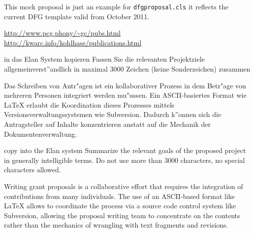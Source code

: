\documentclass[RAM]{dfgproposal}
\begin{document}
\begin{center}\color{red}\huge
  This mock proposal is just an example for \texttt{dfgproposal.cls} it reflects the 
  current DFG template valid from October 2011.
\end{center}

\urldef{\gcpubs}\url{http://www.pcg.phony/~gc/pubs.html}
\urldef{\mikopubs}\url{http://kwarc.info/kohlhase/publications.html}
\begin{proposal}[PI=miko,PI=gc,site=jacu,site=pcg,
  thema=Intelligentes Schreiben von Antr\"agen,
  acronym={iPoWr},
  acrolong={\underline{I}ntelligent} {\underline{P}r\underline{o}posal} {\underline{Wr}iting},
  title=\pn: \protect\pnlong,
  totalduration=3 years,
  since=1. Feb 2009,
  start=1. Feb. 2010,
  months=24,
  pcgRM=36, pcgRAM=36, jacuRM=36, jacuRAM=36,
  discipline=Computer Science, 
  areas=Knowledge Management]

\begin{Zusammenfassung}
  \begin{todo}{in das Elan System kopieren}
    Fassen Sie die relevanten Projektziele allgemeinverst''andlich in maximal 3000 Zeichen
    (keine Sonderzeichen) zusammen
  \end{todo}
  Das Schreiben von Antr"agen ist ein kollaborativer Prozess in dem Betr"age von mehreren
  Personen integriert werden mu"ussen. Ein ASCII-basiertes Format wie {\LaTeX} erlaubt die
  Koordination dieses Prozesses mittels Versionsverwaltungssystemen wie
  Subversion. Dadurch k''onnen sich die Antragsteller auf Inhalte konzentrieren anstatt
  auf die Mechanik der Dokumentenverwaltung.
\end{Zusammenfassung}

\begin{Summary}
  \begin{todo}{copy into the Elan system}
    Summarize the relevant goals of the proposed project in generally intelligible
    terms. Do not use more than 3000 characters, no special characters allowed.
  \end{todo}
  Writing grant proposals is a collaborative effort that requires the integration of
  contributions from many individuals. The use of an ASCII-based format like {\LaTeX}
  allows to coordinate the process via a source code control system like Subversion,
  allowing the proposal writing team to concentrate on the contents rather than the
  mechanics of wrangling with text fragments and revisions.
\end{Summary}


\end{proposal}
\end{document}
